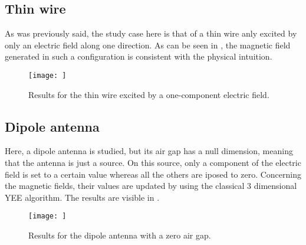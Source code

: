 \documentclass[12 pt]{report}
\begin{document}
\subsection{Thin wire}
As was previously said, the study case here is that of a thin wire anly excited by only an electric field along one direction. As can be seen in , the magnetic field generated in such a configuration is consistent with the physical intuition.
%
\begin{figure}
	\centering
	\texttt{[image: ]}
	\caption{Results for the thin wire excited by a one-component electric field.}
	\label{fig:THINWIRE}
\end{figure}
%


\subsection{Dipole antenna}
Here, a dipole antenna is studied, but its air gap has a null dimension, meaning that the antenna is just a source. On this source, only a component of the electric field is set to a certain value whereas all the others are iposed to zero. Concerning the magnetic fields, their values are updated by using the classical 3 dimensional YEE algorithm. The results are visible in .
%
\begin{figure}
	\centering
	\texttt{[image: ]}
	\caption{Results for the dipole antenna with a zero air gap.}
	\label{fig:DIPOLEANTENNA}
\end{figure}
%
\end{document}
